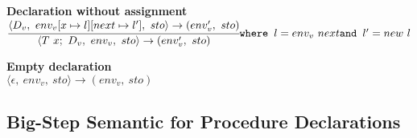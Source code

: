 \textbf{Declaration without assignment}\\
\begin{math}
	\cfrac
		{\langle D_v,\ env_v[x \mapsto l][next \mapsto l'],\ sto \rangle \rightarrow (env_v',\ sto)}
		{\langle T\ x;\ D_v,\ env_v,\ sto \rangle \rightarrow (env_v',\ sto)}\\
	\texttt{where } l = env_v\ next\\
	\texttt{and } l' = new\ l
\end{math}

\textbf{Empty declaration}\\
\begin{math}
	\langle \epsilon,\ env_v,\ sto \rangle \rightarrow (env_v,\ sto)
\end{math}





\subsection{Big-Step Semantic for Procedure Declarations}

